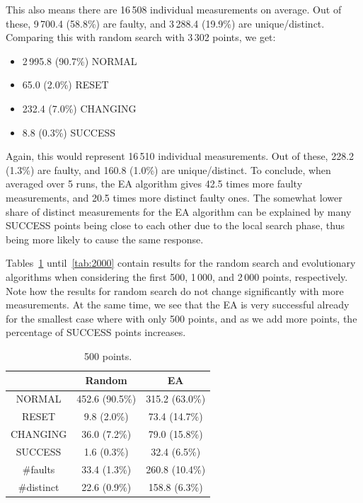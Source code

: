 \documentclass[times, utf8, diplomski]{fer}
\begin{document}
This also means there are 16\,508 individual measurements on average.
Out of these, 9\,700.4 (58.8\%) are faulty, and 3\,288.4 (19.9\%) are unique/distinct.
Comparing this with random search with 3\,302 points, we get:
\begin{itemize}
	\item 2\,995.8 (90.7\%) NORMAL
	\item 65.0 (2.0\%) RESET
	\item 232.4 (7.0\%) CHANGING
	\item 8.8 (0.3\%) SUCCESS
\end{itemize}

Again, this would represent 16\,510 individual measurements.
Out of these, 228.2 (1.3\%) are faulty, and 160.8 (1.0\%) are unique/distinct.
To conclude, when averaged over 5 runs, the EA algorithm gives 42.5 times more faulty
measurements, and 20.5 times more distinct faulty ones.
The somewhat lower share of distinct measurements for the EA algorithm
can be explained by many SUCCESS points being close to each other due to the
local search phase, thus being more likely to cause the same response.

Tables~\ref{tab:500} until~\ref{tab:2000} contain results for the random search
and evolutionary algorithms when considering the first 500, 1\,000, and 2\,000
points, respectively. Note how the results for random search do not change
significantly with more measurements. At the same time, we see that the EA is
very successful already for the smallest case where with only 500 points,
and as we add more points, the percentage of SUCCESS points increases.

\begin{table}[!hbtp]
	\small
	\caption{500 points.}
	\label{tab:500}
	\centering
	\begin{tabular}{ccc}
		           &     Random     &       EA       \\ \toprule
		  NORMAL   & 452.6 (90.5\%) & 315.2 (63.0\%) \\
		  RESET    &  9.8 (2.0\%)   & 73.4 (14.7\%)  \\
		 CHANGING  &  36.0 (7.2\%)  & 79.0 (15.8\%)  \\
		 SUCCESS   &  1.6 (0.3\%)   &  32.4 (6.5\%)  \\ \midrule
		 \#faults  &  33.4 (1.3\%)  & 260.8 (10.4\%) \\
		\#distinct &  22.6 (0.9\%)  & 158.8 (6.3\%)  \\ \bottomrule
	\end{tabular}
\end{table}
\end{document}
